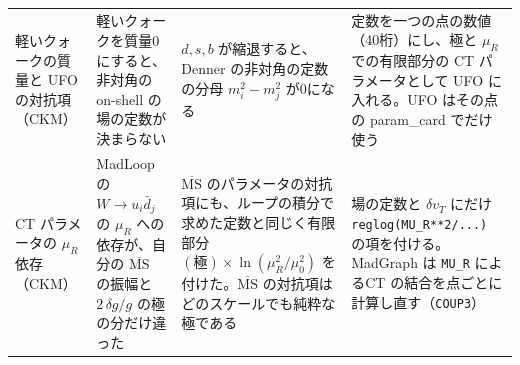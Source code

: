 \documentclass[a4paper,10pt]{ltjsarticle}
\begin{document}
\begin{table}[tbp]
\begin{tabularx}{\linewidth}{>{\raggedright\arraybackslash}p{2.4cm}>{\raggedright\arraybackslash}X>{\raggedright\arraybackslash}X>{\raggedright\arraybackslash}X}
軽いクォークの質量と UFO の対抗項（CKM） & 軽いクォークを質量0にすると、非対角の on-shell の場の定数が決まらない & $d,s,b$ が縮退すると、Denner の非対角の定数の分母 $m_i^2-m_j^2$ が0になる & 定数を一つの点の数値（40桁）にし、極と $\mu_R$ での有限部分の CT パラメータとして UFO に入れる。UFO はその点の param\_card でだけ使う \\
CT パラメータの $\mu_R$ 依存（CKM） & MadLoop の $W\to u_i\bar d_j$ の $\mu_R$ への依存が、自分の $\overline{\mathrm{MS}}$ の振幅と $2\,\delta g/g$ の極の分だけ違った & $\overline{\mathrm{MS}}$ のパラメータの対抗項にも、ループの積分で求めた定数と同じく有限部分 $(\text{極})\times\ln(\mu_R^2/\mu_0^2)$ を付けた。$\overline{\mathrm{MS}}$ の対抗項はどのスケールでも純粋な極である & 場の定数と $\delta v_T$ にだけ \texttt{reglog(MU\_R**2/...)} の項を付ける。MadGraph は \texttt{MU\_R} によるCT の結合を点ごとに計算し直す（\texttt{COUP3}） \\
\bottomrule
\end{tabularx}
\end{table}
\end{document}
